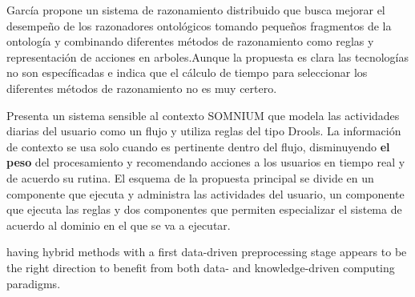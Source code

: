 \cite{Garcia-Sola2014} García propone un sistema de razonamiento distribuido que busca mejorar el desempeño de los razonadores ontológicos tomando pequeños fragmentos de la ontología y combinando diferentes métodos de razonamiento como reglas y representación de acciones en arboles.Aunque la propuesta es clara las tecnologías no son específicadas e indica que el cálculo de tiempo para seleccionar los diferentes métodos de razonamiento no es muy certero.

\cite{Avenoglu2017} Presenta un sistema sensible al contexto SOMNIUM que modela las actividades diarias del usuario como un flujo y utiliza reglas del tipo Drools. La información de contexto se usa solo cuando es pertinente dentro del flujo, disminuyendo \textbf{el peso} del procesamiento y recomendando acciones a los usuarios en tiempo real y de acuerdo su rutina. El esquema de la propuesta principal se divide en un componente que ejecuta y administra las actividades del usuario, un componente que ejecuta las reglas y dos componentes que permiten especializar el sistema de acuerdo al dominio en el que se va a ejecutar.



\cite{Iaz2014} 
having hybrid methods with a first data-driven preprocessing stage appears to be the right direction
to benefit from both data- and knowledge-driven computing paradigms.











